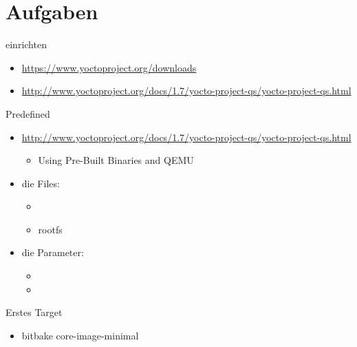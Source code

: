 \section{Aufgaben}
\begin{frame}{\yocto}{einrichten}
 \begin{itemize}
  \item {\tiny \url{https://www.yoctoproject.org/downloads}}
  \item {\tiny\url{http://www.yoctoproject.org/docs/1.7/yocto-project-qs/yocto-project-qs.html}}
 \end{itemize}
\end{frame}

\begin{frame}{\yocto}{Predefined}
 \begin{itemize}
  \item {\tiny\url{http://www.yoctoproject.org/docs/1.7/yocto-project-qs/yocto-project-qs.html}}
  \begin{itemize}
   \item Using Pre-Built Binaries and QEMU
  \end{itemize}
  \item die Files:
  \begin{itemize}
   \item {} 
   \item {} rootfs
  \end{itemize}
  \item {} die Parameter:
  \begin{itemize}
   \item {}
   \item {}
  \end{itemize}
 \end{itemize} 
\end{frame}

\begin{frame}{\yocto}{Erstes Target}
\begin{itemize}
 \item bitbake core-image-minimal
\end{itemize}
\end{frame}
